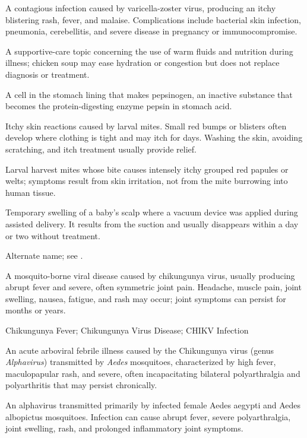  A contagious infection caused by varicella-zoster virus, producing an itchy blistering rash, fever, and malaise. Complications include bacterial skin infection, pneumonia, cerebellitis, and severe disease in pregnancy or immunocompromise.

 A supportive-care topic concerning the use of warm fluids and nutrition during illness; chicken soup may ease hydration or congestion but does not replace diagnosis or treatment.

 A cell in the stomach lining that makes pepsinogen, an inactive substance that becomes the protein-digesting enzyme pepsin in stomach acid.

 Itchy skin reactions caused by larval mites. Small red bumps or blisters often develop where clothing is tight and may itch for days. Washing the skin, avoiding scratching, and itch treatment usually provide relief.

 Larval harvest mites whose bite causes intensely itchy grouped red papules or welts; symptoms result from skin irritation, not from the mite burrowing into human tissue.

 Temporary swelling of a baby's scalp where a vacuum device was applied during assisted delivery. It results from the suction and usually disappears within a day or two without treatment.

 Alternate name; see .

 A mosquito-borne viral disease caused by chikungunya virus, usually producing abrupt fever and severe, often symmetric joint pain. Headache, muscle pain, joint swelling, nausea, fatigue, and rash may occur; joint symptoms can persist for months or years.

\synonyms
Chikungunya Fever; Chikungunya Virus Disease; CHIKV Infection

 An acute arboviral febrile illness caused by the Chikungunya virus (genus \textit{Alphavirus}) transmitted by \textit{Aedes} mosquitoes, characterized by high fever, maculopapular rash, and severe, often incapacitating bilateral polyarthralgia and polyarthritis that may persist chronically.

 An alphavirus transmitted primarily by infected female Aedes aegypti and Aedes albopictus mosquitoes. Infection can cause abrupt fever, severe polyarthralgia, joint swelling, rash, and prolonged inflammatory joint symptoms.

